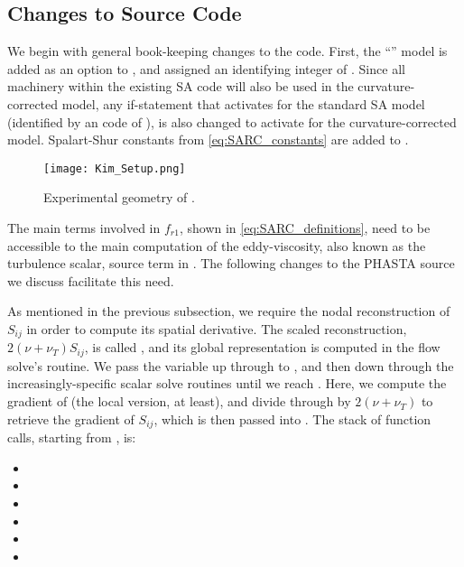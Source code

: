 \documentclass[11pt]{article}
\begin{document}
\subsection{Changes to Source Code}

We begin with general book-keeping changes to the code. First, the ``'' model is added as an option to , and assigned an identifying  integer of . Since all machinery within the existing SA code will also be used in the curvature-corrected model, any if-statement that activates for the standard SA model (identified by an  code of ), is also changed to activate for the curvature-corrected model. Spalart-Shur constants from \eqref{eq:SARC_constants} are added to .

\begin{wrapfigure}{r}{3.8in}
\centering
\texttt{[image: Kim\_Setup.png]}
\caption{Experimental geometry of \citet{kim1994}.}
\label{fig:setup_Kim}
\end{wrapfigure}

The main terms involved in $f_{r1}$, shown in \eqref{eq:SARC_definitions}, need to be accessible to the main computation of the eddy-viscosity, also known as the turbulence scalar, source term in . The following changes to the PHASTA source we discuss facilitate this need.

As mentioned in the previous subsection, we require the nodal reconstruction of $S_{ij}$ in order to compute its spatial derivative. The scaled reconstruction, $2 (\nu + \nu_T) S_{ij}$, is called , and its global representation is computed in the flow solve's  routine. We pass the variable up through  to , and then down through the increasingly-specific scalar solve routines until we reach . Here, we compute the gradient of  (the local version, at least), and divide through by $2(\nu + \nu_T)$ to retrieve the gradient of $S_{ij}$, which is then passed into . The stack of function calls, starting from , is:
\begin{itemize}
\item {}
\item {}
\item {}
\item {}
\item {}
\item {}
\end{itemize}
\end{document}
